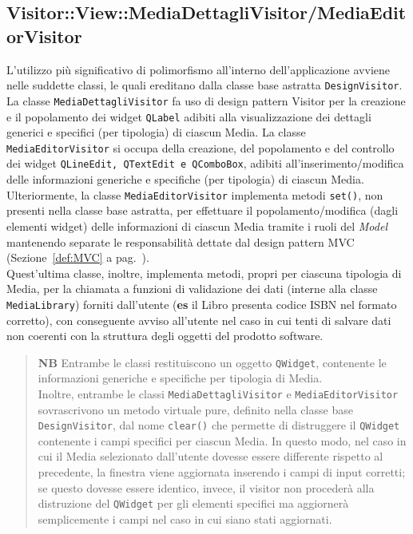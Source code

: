 \documentclass[a4paper,10pt]{article}
\begin{document}
	\subsection{Visitor::View::MediaDettagliVisitor/MediaEditorVisitor}\label{def:visitor}
	L'utilizzo più significativo di polimorfismo all'interno dell'applicazione avviene nelle suddette classi, le quali ereditano dalla classe base astratta \texttt{DesignVisitor}.\\
	La classe \texttt{MediaDettagliVisitor} fa uso di design pattern Visitor per la creazione e il popolamento dei widget \texttt{QLabel} adibiti alla visualizzazione dei dettagli generici e specifici (per tipologia) di ciascun Media.
	La classe \texttt{MediaEditorVisitor} si occupa della creazione, del popolamento e del controllo dei widget \texttt{QLineEdit, QTextEdit e QComboBox}, adibiti all'inserimento/modifica delle informazioni generiche e specifiche (per tipologia) di ciascun Media. Ulteriormente, la classe \texttt{MediaEditorVisitor} implementa metodi \texttt{set()}, non presenti nella classe base astratta, per effettuare il popolamento/modifica (dagli elementi widget) delle informazioni di ciascun Media tramite i ruoli del \textit{Model} mantenendo separate le responsabilità dettate dal design pattern MVC (Sezione~\ref{def:MVC} a pag.~\pageref{def:MVC}).\\
	Quest'ultima classe, inoltre, implementa metodi, propri per ciascuna tipologia di Media, per la chiamata a funzioni di validazione dei dati (interne alla classe \texttt{MediaLibrary}) forniti dall'utente (\textbf{es} il Libro presenta codice ISBN nel formato corretto), con conseguente avviso all'utente nel caso in cui tenti di salvare dati non coerenti con la struttura degli oggetti del prodotto software.\\
	\begin{quote}
		\textbf{NB} Entrambe le classi restituiscono un oggetto \texttt{QWidget}, contenente le informazioni generiche e specifiche per tipologia di Media.\\
		Inoltre, entrambe le classi \texttt{MediaDettagliVisitor} e \texttt{MediaEditorVisitor} sovrascrivono un metodo virtuale pure, definito nella classe base \texttt{DesignVisitor}, dal nome \texttt{clear()} che permette di distruggere il \texttt{QWidget} contenente i campi specifici per ciascun Media. In questo modo, nel caso in cui il Media selezionato dall'utente dovesse essere differente rispetto al precedente, la finestra viene aggiornata inserendo i campi di input corretti; se questo dovesse essere identico, invece, il visitor non procederà alla distruzione del \texttt{QWidget} per gli elementi specifici ma aggiornerà semplicemente i campi nel caso in cui siano stati aggiornati.
	\end{quote}
	
\end{document}
